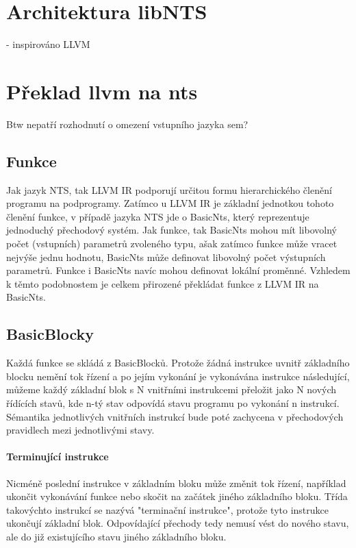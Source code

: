 \documentclass[10pt,a4paper,notitlepage]{report}
\begin{document}


\section{Architektura libNTS}
- inspirováno LLVM

\section{Překlad llvm na nts}
Btw nepatří rozhodnutí o omezení vstupního jazyka sem?

\subsection{Funkce}
Jak jazyk NTS, tak LLVM IR podporují určitou formu hierarchického členění programu na podprogramy. Zatímco u LLVM IR je základní jednotkou tohoto členění funkce, v případě jazyka NTS jde o BasicNts, který reprezentuje jednoduchý přechodový systém. Jak funkce, tak BasicNts mohou mít libovolný počet (vstupních) parametrů zvoleného typu, ašak zatímco funkce může vracet nejvýše jednu hodnotu, BasicNts může definovat libovolný počet výstupních parametrů. Funkce i BasicNts navíc mohou definovat lokální proměnné. Vzhledem k těmto podobnostem je celkem přirozené překládat funkce z LLVM IR na BasicNts.

\subsection{BasicBlocky}
Každá funkce se skládá z BasicBlocků. Protože žádná instrukce uvnitř základního blocku nemění tok řízení a po jejím vykonání je vykonávána instrukce následující, můžeme každý základní blok s N vnitřními instrukcemi přeložit jako N nových řídících stavů, kde n-tý stav odpovídá stavu programu po vykonání n instrukcí. Sémantika jednotlivých vnitřních instrukcí bude poté zachycena v přechodových pravidlech mezi jednotlivými stavy.

\paragraph{Terminující instrukce}
Nicméně poslední instrukce v základním bloku může změnit tok řízení, například ukončit vykonávání funkce nebo skočit na začátek jiného základního bloku. Třída takovýchto instrukcí se nazývá "terminační instrukce", protože tyto instrukce ukončují základní blok. Odpovídající přechody tedy nemusí vést do nového stavu, ale do již existujícího stavu jiného základního bloku.
\end{document}
